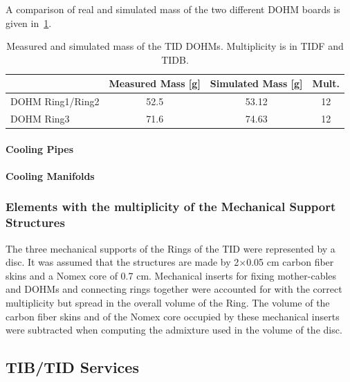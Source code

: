 \documentclass{cmspaper}
\begin{document}
A comparison of real and simulated mass of the two different DOHM
boards is given in~\ref{tab:tid_dohm}.
\begin{table}[h!]
  \caption{Measured and simulated mass of the TID DOHMs.  Multiplicity is in TIDF and TIDB.}
  \label{tab:tid_dohm}
  \begin{center}
    \begin{tabular}{lccc}
      & Measured Mass [g] & Simulated Mass [g] & Mult.\\
      \hline
      DOHM Ring1/Ring2 & 52.5 & 53.12 & 12 \\
      DOHM Ring3       & 71.6 & 74.63 & 12 \\
      \hline
    \end{tabular}
  \end{center}
\end{table}

\paragraph{Cooling Pipes}
\paragraph{Cooling Manifolds}

\subsubsection{Elements with the multiplicity of the Mechanical Support Structures}
The three mechanical supports of the Rings of the TID were represented
by a disc. It was assumed that the structures are made by 2$\times$0.05 cm carbon fiber
skins and a Nomex core of 0.7 cm. Mechanical inserts for fixing
mother-cables and DOHMs and connecting rings together were accounted for
with the correct multiplicity but spread in the overall volume of the Ring.
The volume of the carbon fiber skins and of the Nomex core occupied
by these mechanical inserts were subtracted when computing the admixture
used in the volume of the disc.

\subsection{TIB/TID Services}

\pagebreak
\end{document}
